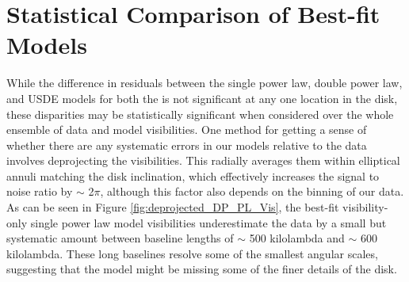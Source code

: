 {{%

\section{Statistical Comparison of Best-fit Models}
\label{stats}

While the difference in residuals between the single power law, double power law, and USDE models for both the is not significant at any one location in the disk, these disparities may be statistically significant when considered over the whole ensemble of data and model visibilities. One method for getting a sense of whether there are any systematic errors in our models relative to the data involves deprojecting the visibilities. This radially averages them within elliptical annuli matching the disk inclination, which effectively increases the signal to noise ratio by $\sim$ 2$\pi$, although this factor also depends on the binning of our data. As can be seen in Figure \ref{fig:deprojected_DP_PL_Vis}, the best-fit visibility-only single power law model visibilities underestimate the data by a small but systematic amount between baseline lengths of $\sim$ 500 kilolambda and $\sim$ 600 kilolambda. These long baselines resolve some of the smallest angular scales, suggesting that the model might be missing some of the finer details of the disk. 

}}
